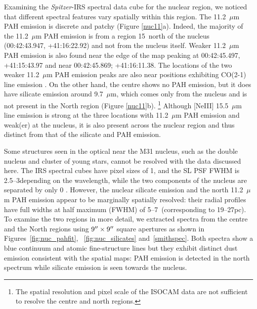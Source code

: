 \label{sect:nucleus}


Examining the {\em Spitzer}-IRS spectral data cube for the nuclear region, we noticed that different spectral features vary spatially within this region.
The 11.2~$\mu$m PAH emission is discrete and patchy (Figure \ref{nuc11}a).  
Indeed, the majority of the 11.2~$\mu$m  PAH emission is from a region 15\arcsec\ north of the nucleus (00:42:43.947, +41:16:22.92) and not from 
the nucleus itself. Weaker 11.2~$\mu$m PAH emission is also found near the edge of the map peaking at 00:42:45.497, +41:15:43.97 and near 00:42:45.869; +41:16:11.38.
The locations of the two weaker 11.2~$\mu$m PAH emission peaks are also near positions exhibiting CO(2-1) line emission \citep[\#36 and 28 of][the strongest 11.2~$\mu$m PAH emission peak is outside the CO FOV]{Melchior2013}. 
On the other hand, the centre shows no PAH emission, but it does have silicate emission around 9.7~$\mu$m, which comes only from the nucleus and is not present in the North region (Figure \ref{nuc11}b).%
\footnote{The spatial resolution and pixel scale of the ISOCAM data are not sufficient to resolve the centre  and north regions.}
Although [NeIII] 15.5~$\mu$m line emission is strong at the three locations with 11.2~$\mu$m PAH emission and weak(er) at the nucleus, 
it is also present across the nuclear region and thus distinct from that of the silicate and PAH emission. 

Some structures  seen in the optical near the M31 nucleus, such as the double nucleus and cluster of young stars, cannot be resolved with the data discussed here.
The IRS spectral cubes have pixel sizes of 1, and the SL PSF FWHM is 2.5--3\arcsec depending on the wavelength,
while the two components of the nucleus are separated by only 0 \citep{Bender2005}.
However, the nuclear silicate emission and the north 11.2~$\mu$m  PAH emission appear to be 
marginally spatially resolved: 
their radial profiles have full widths at half maximum (FWHM) of 5--7\arcsec\ (corresponding to 19--27pc).
To examine the two regions in more detail, 
we extracted spectra from the centre and the North regions using  $9\hbox{$^{\prime\prime}$} \times 9\hbox{$^{\prime\prime}$}$ 
square apertures as shown in Figures~\ref{fig:nuc_pahfit}, ~\ref{fig:nuc_silicates} and~\ref{smithspec}. 
Both spectra show a blue continuum and atomic fine-structure lines but they exhibit distinct dust emission consistent with the spatial maps: PAH emission is detected in the north spectrum while silicate emission is seen towards the nucleus. 

